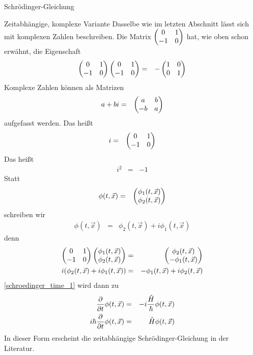 \begin{chapter}{\titlestr}
\begin{section}{Schrödinger-Gleichung}
\begin{subsection}{Zeitabhängige, komplexe Variante}
Dasselbe wie im letzten Abschnitt lässt sich mit komplexen Zahlen beschreiben. Die Matrix $\begin{pmatrix} 0 & 1\\ -1 & 0\end{pmatrix}$ hat, wie oben schon erwähnt, die Eigenschaft
\begin{eqnarray*}
\begin{pmatrix} 0 & 1\\ -1 & 0\end{pmatrix}\begin{pmatrix} 0 & 1\\ -1 & 0\end{pmatrix} &=& -\begin{pmatrix} 1 & 0\\ 0 & 1\end{pmatrix}
\end{eqnarray*}
Komplexe Zahlen können als Matrizen
\begin{eqnarray*}
a+bi &=& \begin{pmatrix} a & b\\ -b & a\end{pmatrix}
\end{eqnarray*}
aufgefasst werden. Das heißt
\begin{eqnarray*}
i &=& \begin{pmatrix} 0 & 1\\ -1 & 0\end{pmatrix}
\end{eqnarray*}
Das heißt
\begin{eqnarray*}
i^2 &=& -1
\end{eqnarray*}
Statt
\begin{eqnarray*}
\phi(t,\vec{x})&=&\begin{pmatrix}\phi_1(t,\vec{x})\\ \phi_2(t,\vec{x})\end{pmatrix}
\end{eqnarray*}
schreiben wir
\begin{eqnarray*}
\phi(t,\vec{x})&=&\phi_2(t,\vec{x})+i\phi_1(t,\vec{x})
\end{eqnarray*}
denn
\begin{eqnarray*}
\begin{pmatrix} 0 & 1\\ -1 & 0\end{pmatrix}\begin{pmatrix}\phi_1(t,\vec{x})\\ \phi_2(t,\vec{x})\end{pmatrix}
&=&
\begin{pmatrix}\phi_2(t,\vec{x})\\-\phi_1(t,\vec{x})\end{pmatrix}\\
i(\phi_2(t,\vec{x})+i\phi_1(t,\vec{x})) &=& -\phi_1(t,\vec{x})+i\phi_2(t,\vec{x})
\end{eqnarray*}
\ref{schroedinger_time_1} wird dann zu
\begin{eqnarray}
\label{schrödinger_complex}
\frac{\partial}{\partial t} \phi(t,\vec{x}) &=&-i\frac{\hat{H}}{\hbar} \phi(t,\vec{x}) \cr
i\hbar\frac{\partial}{\partial t} \phi(t,\vec{x}) &=&\hat{H}\phi(t,\vec{x})
\end{eqnarray}
In dieser Form erscheint die zeitabhängige Schrödinger-Gleichung in der Literatur.


\end{subsection}
\end{section}
\end{chapter}
